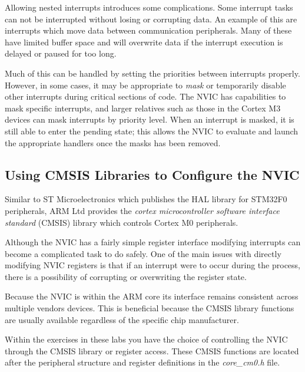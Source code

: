 \documentclass[11pt,fleqn]{book} %
\begin{document}
Allowing nested interrupts introduces some complications. Some interrupt tasks can not be interrupted without losing or corrupting data. An example of this are interrupts which move data between communication peripherals. Many of these have limited buffer space and will overwrite data if the interrupt execution is delayed or paused for too long. 

Much of this can be handled by setting the priorities between interrupts properly. However, in some cases, it may be appropriate to \textit{mask} or temporarily disable other interrupts during critical sections of code. The NVIC has capabilities to mask specific interrupts, and larger relatives such as those in the Cortex M3 devices can mask interrupts by priority level. When an interrupt is masked, it is still able to enter the pending state; this allows the NVIC to evaluate and launch the appropriate handlers once the masks has been removed.
 

 
\subsection{Using CMSIS Libraries to Configure the NVIC}
Similar to ST Microelectronics which publishes the HAL library for STM32F0 peripherals, ARM Ltd provides the \textit{cortex microcontroller software interface standard} (CMSIS) library which controls Cortex M0 peripherals. 

Although the NVIC has a fairly simple register interface modifying interrupts can become a complicated task to do safely. One of the main issues with directly modifying NVIC registers is that if an interrupt were to occur during the process, there is a possibility of corrupting or overwriting the register state.  

Because the NVIC is within the ARM core its interface remains consistent across multiple vendors devices. This is beneficial because the CMSIS library functions are usually available regardless of the specific chip manufacturer. 

Within the exercises in these labs you have the choice of controlling the NVIC through the CMSIS library or register access. These CMSIS functions are located after the peripheral structure and register definitions in the \textit{core\_cm0.h} file. 


\end{document}
